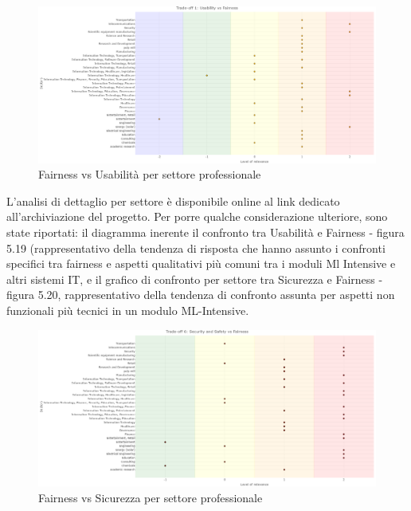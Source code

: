     
    \begin{figure}[h!]
        \centering
        \includegraphics[width=1\textwidth]{figure/Analisi/RQ3/TradeOffsBySectors/1. UsabilityVsFairness.png}
        \caption{Fairness vs Usabilità per settore professionale}
    \end{figure}
    
    L'analisi di dettaglio per settore è disponibile online al link dedicato all'archiviazione del progetto. Per porre qualche considerazione ulteriore, sono state riportati: il diagramma inerente il confronto tra Usabilità e Fairness - figura 5.19 (rappresentativo della tendenza di risposta che hanno assunto i confronti specifici tra fairness e aspetti qualitativi più comuni tra i moduli Ml Intensive e altri sistemi IT,  e il grafico di confronto per settore tra Sicurezza e Fairness - figura 5.20, rappresentativo della tendenza di confronto assunta per aspetti non funzionali più tecnici in un modulo ML-Intensive.
    
    \begin{figure}[h!]
        \centering
        \includegraphics[width=1\textwidth]{figure/Analisi/RQ3/TradeOffsBySectors/6.SecurityAndSafetyVsFairness.png}
        \caption{Fairness vs Sicurezza per settore professionale}
    \end{figure}
    

